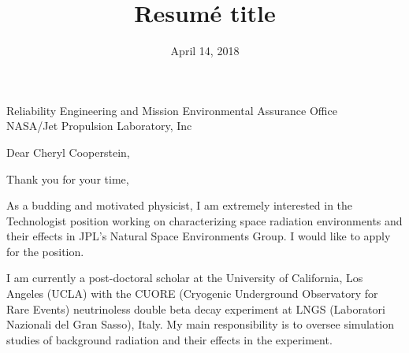 \documentclass[12pt,letterpaper,sans]{moderncv}        %
\title{Resumé title}                               %
\begin{document}
{Reliability Engineering and Mission Environmental Assurance Office\\NASA/Jet Propulsion Laboratory, Inc}
\date{April 14, 2018}
\opening{Dear Cheryl Cooperstein,}
\closing{Thank you for your time,}
\makelettertitle

As a budding and motivated physicist, I am extremely interested in the
Technologist position working on characterizing space radiation environments
and their effects in JPL's Natural Space Environments Group. I would like to
apply for the position.

I am currently a post-doctoral scholar at the University of California, Los
Angeles (UCLA) with the CUORE (Cryogenic Underground Observatory for Rare
Events) neutrinoless double beta decay experiment at LNGS (Laboratori Nazionali
del Gran Sasso), Italy. My main responsibility is to oversee simulation studies
of background radiation and their effects in the experiment.


\end{document}
